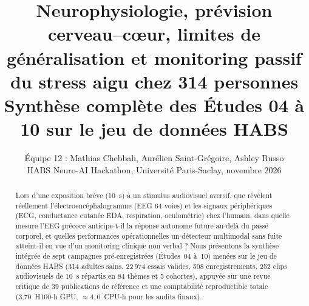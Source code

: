 \documentclass[10pt]{article}
\title{Neurophysiologie, prévision cerveau--cœur, limites de généralisation et monitoring passif du stress aigu chez 314 personnes\\
\large Synthèse complète des Études 04 à 10 sur le jeu de données HABS}
\author{Équipe 12 : Mathias Chebbah, Aurélien Saint-Grégoire, Ashley Russo\\
\small HABS Neuro-AI Hackathon, Université Paris-Saclay, novembre 2026}
\date{}
\begin{document}
\maketitle

\begin{abstract}
\noindent Lors d'une exposition brève (10~s) à un stimulus audiovisuel aversif, que révèlent réellement l'électroencéphalogramme (EEG 64 voies) et les signaux périphériques (ECG, conductance cutanée EDA, respiration, oculométrie) chez l'humain, dans quelle mesure l'EEG précoce anticipe-t-il la réponse autonome future au-delà du passé corporel, et quelles performances opérationnelles un détecteur multimodal sans fuite atteint-il en vue d'un monitoring clinique non verbal ? Nous présentons la synthèse intégrée de sept campagnes pré-enregistrées (Études~04 à~10) menées sur le jeu de données HABS (314 adultes sains, 22\,974 essais valides, 508 enregistrements, 252 clips audiovisuels de 10~s répartis en 84 thèmes et 5 cohortes), appuyée sur une revue critique de 39 publications de référence et une comptabilité reproductible totale (3,70~H100-h GPU, $\approx 4{,}0$~CPU-h pour les audits finaux).


\end{abstract}
\end{document}
